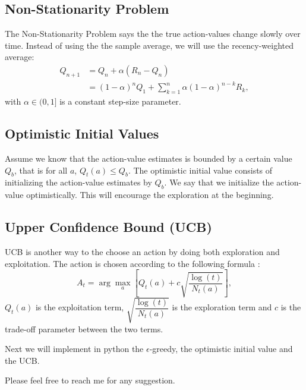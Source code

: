 \documentclass[12pt,a4paper]{report}
\begin{document}
	\subsection*{Non-Stationarity Problem}
	The Non-Stationarity Problem says the the true action-values change slowly over time. Instead of using the the sample average, we will use the recency-weighted average:
	\begin{align*}
		Q_{n+1} &= Q_n + \alpha(R_n - Q_n) \\ 
		&= (1 - \alpha)^n Q_1 + \sum_{k=1}^{n}\alpha(1-\alpha)^{n-k}R_k,
	\end{align*}
	with $\alpha \in (0,1]$ is a constant step-size parameter.
	
	\subsection*{Optimistic Initial Values}
	Assume we know that the action-value estimates is bounded by a certain value $Q_b$, that is for all $a$, $Q_t(a) \leq Q_b$. The optimistic initial value consists of initializing the action-value estimates by $Q_b$. We say that we initialize the action-value optimistically. This will encourage the exploration at the beginning.
	
	\subsection*{Upper Confidence Bound (UCB)}
	UCB is another way to the choose an action by doing both exploration and exploitation. The action is chosen according to the following formula :
	$$A_t = \arg\max_{a} \left[Q_t(a) + c \sqrt{\dfrac{\log(t)}{N_t(a)}}\right],$$
	$Q_t(a)$ is the exploitation term, $\sqrt{\dfrac{\log(t)}{N_t(a)}}$ is the exploration term and $c$ is the trade-off parameter between the two terms.
	
	Next we will implement in python the $\epsilon$-greedy, the optimistic initial value and the UCB. 
	
	Please feel free to reach me for any suggestion.
\end{document}
